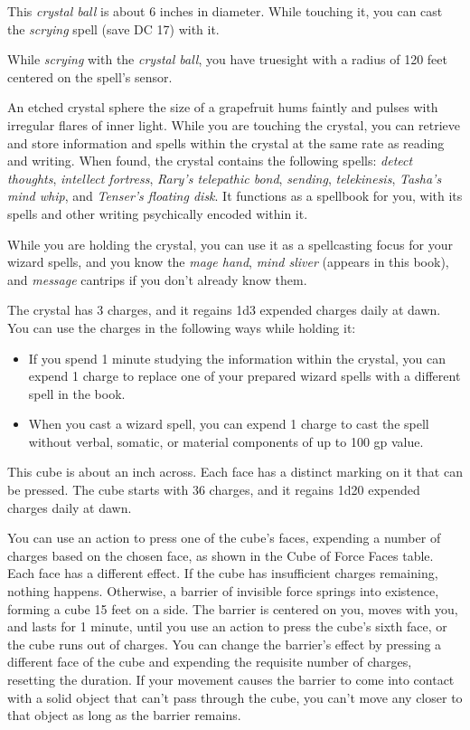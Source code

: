 \documentclass[10pt,a4paper,twoside,bg=print,twocolumn,openany,nodeprecatedcode]{dndbook}
\begin{document}
This \textit{crystal ball} is about 6 inches in diameter. While touching it, you can cast the \textit{scrying} spell (save DC 17) with it.

While \textit{scrying} with the \textit{crystal ball}, you have truesight with a radius of 120 feet centered on the spell's sensor.

An etched crystal sphere the size of a grapefruit hums faintly and pulses with irregular flares of inner light. While you are touching the crystal, you can retrieve and store information and spells within the crystal at the same rate as reading and writing. When found, the crystal contains the following spells: \textit{detect thoughts}, \textit{intellect fortress}, \textit{Rary's telepathic bond}, \textit{sending}, \textit{telekinesis}, \textit{Tasha's mind whip}, and \textit{Tenser's floating disk}. It functions as a spellbook for you, with its spells and other writing psychically encoded within it.

While you are holding the crystal, you can use it as a spellcasting focus for your wizard spells, and you know the \textit{mage hand}, \textit{mind sliver} (appears in this book), and \textit{message} cantrips if you don't already know them.

The crystal has 3 charges, and it regains 1d3 expended charges daily at dawn. You can use the charges in the following ways while holding it:


\begin{itemize}
\item If you spend 1 minute studying the information within the crystal, you can expend 1 charge to replace one of your prepared wizard spells with a different spell in the book.
\item When you cast a wizard spell, you can expend 1 charge to cast the spell without verbal, somatic, or material components of up to 100 gp value.
\end{itemize}

This cube is about an inch across. Each face has a distinct marking on it that can be pressed. The cube starts with 36 charges, and it regains 1d20 expended charges daily at dawn.

You can use an action to press one of the cube's faces, expending a number of charges based on the chosen face, as shown in the Cube of Force Faces table. Each face has a different effect. If the cube has insufficient charges remaining, nothing happens. Otherwise, a barrier of invisible force springs into existence, forming a cube 15 feet on a side. The barrier is centered on you, moves with you, and lasts for 1 minute, until you use an action to press the cube's sixth face, or the cube runs out of charges. You can change the barrier's effect by pressing a different face of the cube and expending the requisite number of charges, resetting the duration. If your movement causes the barrier to come into contact with a solid object that can't pass through the cube, you can't move any closer to that object as long as the barrier remains.
\end{document}
